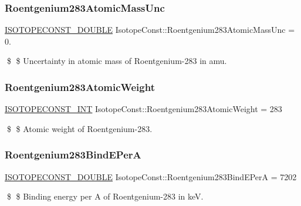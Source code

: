 \subsubsection{\texorpdfstring{Roentgenium283\+Atomic\+Mass\+Unc}{Roentgenium283AtomicMassUnc}}
{\footnotesize\ttfamily \mbox{\hyperlink{group___isotope_const-_macros_ga8f45a7272ce02c0b4c65c44636ed719a}{I\+S\+O\+T\+O\+P\+E\+C\+O\+N\+S\+T\+\_\+\+D\+O\+U\+B\+LE}} Isotope\+Const\+::\+Roentgenium283\+Atomic\+Mass\+Unc = 0.}

\$ \$ Uncertainty in atomic mass of Roentgenium-\/283 in amu. \mbox{\label{group___isotope_const-_roentgenium-_rg283_gad17343b13cf120c09006e86fa2ac6e37}} 
\subsubsection{\texorpdfstring{Roentgenium283\+Atomic\+Weight}{Roentgenium283AtomicWeight}}
{\footnotesize\ttfamily \mbox{\hyperlink{group___isotope_const-_macros_ga5f18360b3e99483a35c32d789e62621c}{I\+S\+O\+T\+O\+P\+E\+C\+O\+N\+S\+T\+\_\+\+I\+NT}} Isotope\+Const\+::\+Roentgenium283\+Atomic\+Weight = 283}

\$ \$ Atomic weight of Roentgenium-\/283. \mbox{\label{group___isotope_const-_roentgenium-_rg283_ga85a41fdb23cef94b3857da9efbdc0782}} 
\subsubsection{\texorpdfstring{Roentgenium283\+Bind\+E\+PerA}{Roentgenium283BindEPerA}}
{\footnotesize\ttfamily \mbox{\hyperlink{group___isotope_const-_macros_ga8f45a7272ce02c0b4c65c44636ed719a}{I\+S\+O\+T\+O\+P\+E\+C\+O\+N\+S\+T\+\_\+\+D\+O\+U\+B\+LE}} Isotope\+Const\+::\+Roentgenium283\+Bind\+E\+PerA = 7202}

\$ \$ Binding energy per A of Roentgenium-\/283 in keV. \mbox{\label{group___isotope_const-_roentgenium-_rg283_ga8e8ffd380d56bc12251443930931610f}} 
